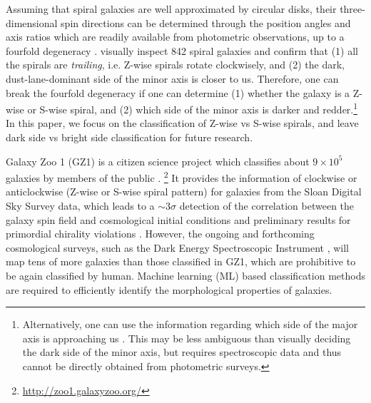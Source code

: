 \documentclass[twocolumn]{aastex631}
\begin{document}
Assuming that spiral galaxies are well approximated by circular disks, their three-dimensional spin directions can be determined through the position angles and axis ratios which are readily available from photometric observations, up to a fourfold degeneracy \citep[see Figure 2 of][for a visual illustration]{2021NatAs...5..283M}.
\citet{iye2019spin} visually inspect 842 spiral galaxies and confirm that (1) all the spirals are \textit{trailing}, i.e. Z-wise spirals rotate clockwisely, and (2) the dark, dust-lane-dominant side of the minor axis is closer to us.
Therefore, one can break the fourfold degeneracy if one can determine (1) whether the galaxy is a Z-wise or S-wise spiral, and (2) which side of the minor axis is darker and redder.\footnote{Alternatively, one can use the information regarding which side of the major axis is approaching us \citep[][]{1995ApJ...445...46H,2000ApJ...543L.107P,2021NatAs...5..283M}. This may be less ambiguous than visually deciding the dark side of the minor axis, but requires spectroscopic data and thus cannot be directly obtained from photometric surveys.}
In this paper, we focus on the classification of Z-wise vs S-wise spirals, and leave dark side vs bright side classification for future research.

Galaxy Zoo 1 (GZ1) is a citizen science project which classifies about $9\times10^5$ galaxies by members of the public \citep[][]{lintott2008galaxy,lintott2011galaxy}.
\footnote{\url{http://zoo1.galaxyzoo.org/}}
It provides the information of clockwise or anticlockwise (Z-wise or S-wise spiral pattern) for galaxies from the Sloan Digital Sky Survey \citep[SDSS,][]{abazajian2009seventh,ahumada202016th} data, which leads to a $\sim3\sigma$ detection of the correlation between the galaxy spin field and cosmological initial conditions \citep[][]{2021NatAs...5..283M} and preliminary results for primordial chirality violations \citep[][]{2022PhRvD.105h3512M}.
However, the ongoing and forthcoming cosmological surveys, such as the Dark Energy Spectroscopic Instrument \citep[DESI,][]{aghamousa2016desi1,aghamousa2016desi2}, will map tens of more galaxies than those classified in GZ1, which are prohibitive to be again classified by human.
Machine learning (ML) based classification methods are required to efficiently identify the morphological properties of galaxies.
\end{document}
